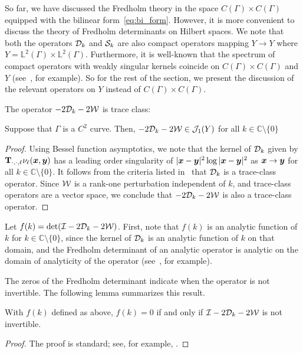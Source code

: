So far, we have discussed the Fredholm theory in the space
$C(\Gamma)\times C(\Gamma)$ equipped with the bilinear form~\cref{eq:bi_form}.
However, it is more convenient to discuss the theory of Fredholm
determinants on Hilbert spaces. 
We note that both the operators ${\mathcal D}_{k}$ and ${\mathcal S}_{k}$ 
are also compact operators mapping $Y \to Y$
where $Y = \mathbb{L}^{2}(\Gamma) \times \mathbb{L}^{2}(\Gamma)$.
Furthermore, it is well-known that the spectrum of compact
operators with weakly singular kernels coincide on 
$C(\Gamma)\times C(\Gamma)$ and $Y$ (see~\cite{kress1989linear},
for example).
So for the rest of the section, we present the discussion of 
the relevant operators on $Y$ instead of $C(\Gamma)\times C(\Gamma)$.


The operator $-2{\mathcal D}_{k} - 2{\mathcal W}$ is trace class:
\begin{lemma}
  Suppose that $\Gamma$ is a $C^2$ curve.
  Then, $-2{\mathcal D}_{k} - 2{\mathcal W} \in {\mathcal J}_1(Y)$
  for all $k \in \mathbb{C} \setminus \{0\}$ 
\end{lemma}
\begin{proof}
Using Bessel function asymptotics, we note that the
kernel of ${\mathcal D}_{k}$ given by ${\bf T}_{\cdot,\cdot,\ell}\nu_{\ell}({\boldsymbol x},{\boldsymbol y})$
has a leading order singularity of
$|{\boldsymbol x}-{\boldsymbol y}|^2 \log{|{\boldsymbol x}-{\boldsymbol y}|^2}$ as ${\boldsymbol x}\to {\boldsymbol y}$ 
for all $k \in \mathbb{C} \setminus \{ 0\}$.
It follows from the criteria listed
in~\cite[Sec. 2]{bornemann2010numerical} that ${\mathcal D}_{k}$
is a trace-class operator.
Since ${\mathcal W}$ is a rank-one perturbation independent of $k$,
and trace-class operators are a vector space, we conclude
that $-2{\mathcal D}_{k} - 2{\mathcal W}$ is also a trace-class operator.
\end{proof}

Let $f(k) = \text{det}(\mathcal I - 2{\mathcal D}_{k} - 2{\mathcal W})$.
First, note that $f(k)$ is an analytic function of $k$
for $k \in \mathbb{C} \setminus \{0 \}$, since the kernel
of ${\mathcal D}_{k}$ is an analytic function of $k$ on that domain, 
and the Fredholm determinant of an analytic operator 
is analytic on the domain of analyticity
of the operator (see~\cite{zhao2015robust}, for example).

The zeros of the Fredholm determinant indicate when the
operator is not invertible.
The following lemma summarizes this result.
\begin{lem} \label{lem:detzeros}
  With $f(k)$ defined as above, $f(k) = 0$ if and only if
  $\mathcal I - 2{\mathcal D}_{k} -2{\mathcal W}$ is not invertible.
\end{lem}
\begin{proof}
  The proof is standard; see, for example,
  \cite[p. 34]{simon2005trace}.
\end{proof}

